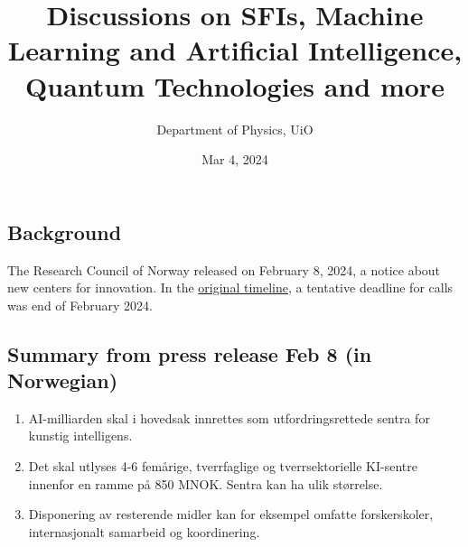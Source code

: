\documentclass[%
oneside,                 %
final,                   %
10pt]{article}
\begin{document}

\newcommand{\exercisesection}[1]{\subsection*{#1}}






\title{Discussions on SFIs, Machine Learning and Artificial Intelligence, Quantum Technologies and more}


\author{Department of Physics, UiO\inst{}}
\institute{}

\date{Mar 4, 2024
}

\subsection{Background}

The Research Council of Norway released on February 8, 2024, a notice about new centers for innovation.
In the \href{{https://www.forskningsradet.no/forskningspolitikk-strategi/ltp/kunstig-intelligens/}}{original timeline}, a tentative deadline for calls was end of February 2024.

\subsection{Summary from press release Feb 8 (in Norwegian)}

\begin{enumerate}
\item AI-milliarden skal i hovedsak innrettes som utfordringsrettede sentra for kunstig intelligens.

\item Det skal utlyses 4-6 femårige, tverrfaglige og tverrsektorielle KI-sentre innenfor en ramme på 850 MNOK. Sentra kan ha ulik størrelse.

\item Disponering av resterende midler kan for eksempel omfatte forskerskoler, internasjonalt samarbeid og koordinering.
\end{enumerate}
\end{document}
